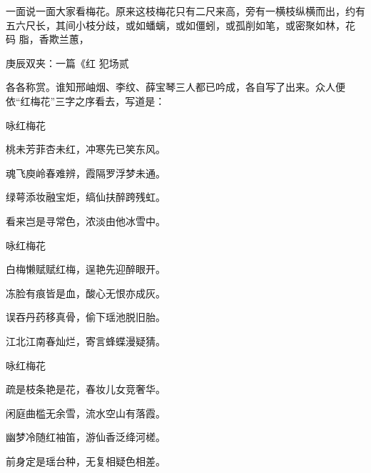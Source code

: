 \begin{parag}
    一面说一面大家看梅花。原来这枝梅花只有二尺来高，旁有一横枝纵横而出，约有五六尺长，其间小枝分歧，或如蟠螭，或如僵蚓，或孤削如笔，或密聚如林，花 码 脂，香欺兰蕙，\begin{note}庚辰双夹：一篇《红 犯场贰\end{note}各各称赏。谁知邢岫烟、李纹、薛宝琴三人都已吟成，各自写了出来。众人便依“红梅花”三字之序看去，写道是：
\end{parag}


\begin{poem}
    \begin{pl}咏红梅花 \end{pl}

    \begin{pl}桃未芳菲杏未红，冲寒先已笑东风。\end{pl}

    \begin{pl}魂飞庾岭春难辨，霞隔罗浮梦未通。\end{pl}

    \begin{pl}绿萼添妆融宝炬，缟仙扶醉跨残虹。\end{pl}

    \begin{pl}看来岂是寻常色，浓淡由他冰雪中。\end{pl}
    \emptypl

    \begin{pl}咏红梅花\end{pl}

    \begin{pl}白梅懒赋赋红梅，逞艳先迎醉眼开。\end{pl}

    \begin{pl}冻脸有痕皆是血，酸心无恨亦成灰。\end{pl}

    \begin{pl}误吞丹药移真骨，偷下瑶池脱旧胎。\end{pl}

    \begin{pl}江北江南春灿烂，寄言蜂蝶漫疑猜。\end{pl}
    \emptypl

    \begin{pl}咏红梅花\end{pl}

    \begin{pl}疏是枝条艳是花，春妆儿女竞奢华。\end{pl}

    \begin{pl}闲庭曲槛无余雪，流水空山有落霞。\end{pl}

    \begin{pl}幽梦冷随红袖笛，游仙香泛绛河槎。\end{pl}

    \begin{pl}前身定是瑶台种，无复相疑色相差。\end{pl}
\end{poem}


